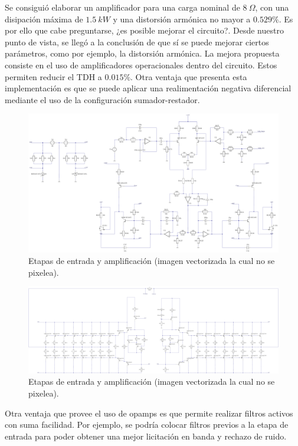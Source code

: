 Se consiguió elaborar un amplificador para una carga nominal de $8 \ \Omega$, con una disipación máxima de $1.5 \ kW$ y una distorsión armónica no mayor a $0.529\%$. Es por ello que cabe preguntarse, ¿es posible mejorar el circuito?. Desde nuestro punto de vista, se llegó a la conclusión de que sí se puede mejorar ciertos parámetros, como por ejemplo, la distorsión armónica. La mejora propuesta consiste en el uso de amplificadores operacionales dentro del circuito. Estos permiten reducir el TDH a $0.015 \%$. Otra ventaja que presenta esta implementación es que se puede aplicar una realimentación negativa diferencial mediante el uso de la configuración sumador-restador.

\begin{figure}[H]
\centering
	\includegraphics[width=\textwidth]{./ImagenesConclusiones/VOPTEX1.pdf}
	\caption{Etapas de entrada y amplificación (imagen vectorizada la cual no se pixelea).}	
\end{figure}
\begin{figure}[H]
\centering
	\includegraphics[width=\textwidth]{./ImagenesConclusiones/VOPTEX2.pdf}
	\caption{Etapas de entrada y amplificación (imagen vectorizada la cual no se pixelea).}
\end{figure}

Otra ventaja que provee el uso de opamps es que permite realizar filtros activos con suma facilidad. Por ejemplo, se podría colocar filtros previos a la etapa de entrada para poder obtener una mejor licitación en banda y rechazo de ruido.